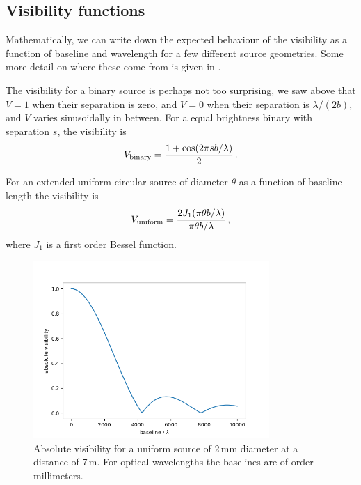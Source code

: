 \documentclass[11pt]{article}
\begin{document}
\subsection{Visibility functions}

Mathematically, we can write down the expected behaviour of the visibility as a function of baseline and wavelength for a few different source geometries. Some more detail on where these come from is given in \citet[][e.g. Fig 2.13]{2011psi..book.....G}.

The visibility for a binary source is perhaps not too surprising, we saw above that $V=1$ when their separation is zero, and $V=0$ when their separation is $\lambda/(2b)$, and $V$ varies sinusoidally in between. For a equal brightness binary with separation $s$, the visibility is
\begin{equation}
    V_{\rm binary} = \frac{1 + \cos ( 2 \pi s b / \lambda )}{2} \, .
\end{equation}

For an extended uniform circular source of diameter $\theta$ as a function of baseline length the visibility is
\begin{equation}
    V_{\rm uniform} = \frac{2 J_1(\pi \theta b / \lambda)}{\pi \theta b / \lambda} \, ,
\end{equation}
where $J_1$ is a first order Bessel function.

\begin{figure}
    \centering
    \includegraphics[width=0.8\textwidth]{doc/uniform_vis.png}
    \caption{Absolute visibility for a uniform source of 2\,mm diameter at a distance of 7\,m. For optical wavelengths the baselines are of order millimeters.}
    \label{fig:uniformvis}
\end{figure}
\end{document}
